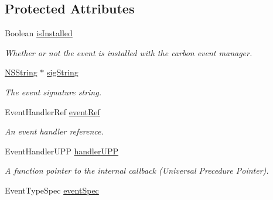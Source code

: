 \subsection*{Protected Attributes}
\begin{DoxyCompactItemize}
\item 
\hypertarget{interface_g_d_carbon_event_a6e9b1a253f2df29a0b15fa278033b7fc}{
Boolean \hyperlink{interface_g_d_carbon_event_a6e9b1a253f2df29a0b15fa278033b7fc}{isInstalled}}
\label{interface_g_d_carbon_event_a6e9b1a253f2df29a0b15fa278033b7fc}

\begin{DoxyCompactList}\small\item\em Whether or not the event is installed with the carbon event manager. \item\end{DoxyCompactList}\item 
\hypertarget{interface_g_d_carbon_event_aaecdb5a2e5158162b9034486f9d81fc5}{
\hyperlink{class_n_s_string}{NSString} $\ast$ \hyperlink{interface_g_d_carbon_event_aaecdb5a2e5158162b9034486f9d81fc5}{sigString}}
\label{interface_g_d_carbon_event_aaecdb5a2e5158162b9034486f9d81fc5}

\begin{DoxyCompactList}\small\item\em The event signature string. \item\end{DoxyCompactList}\item 
\hypertarget{interface_g_d_carbon_event_af21ea340387a4216427700e68575c897}{
EventHandlerRef \hyperlink{interface_g_d_carbon_event_af21ea340387a4216427700e68575c897}{eventRef}}
\label{interface_g_d_carbon_event_af21ea340387a4216427700e68575c897}

\begin{DoxyCompactList}\small\item\em An event handler reference. \item\end{DoxyCompactList}\item 
\hypertarget{interface_g_d_carbon_event_a61a5c0e615568c3f8b6982ed66b6bc32}{
EventHandlerUPP \hyperlink{interface_g_d_carbon_event_a61a5c0e615568c3f8b6982ed66b6bc32}{handlerUPP}}
\label{interface_g_d_carbon_event_a61a5c0e615568c3f8b6982ed66b6bc32}

\begin{DoxyCompactList}\small\item\em A function pointer to the internal callback (Universal Precedure Pointer). \item\end{DoxyCompactList}\item 
\hypertarget{interface_g_d_carbon_event_a5e43acd8e1c5dcc539edadf461425191}{
EventTypeSpec \hyperlink{interface_g_d_carbon_event_a5e43acd8e1c5dcc539edadf461425191}{eventSpec}}
\label{interface_g_d_carbon_event_a5e43acd8e1c5dcc539edadf461425191}


\end{DoxyCompactItemize}
